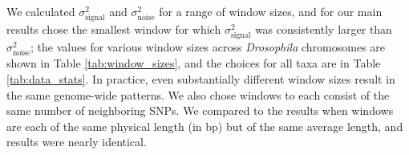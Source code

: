 \documentclass[11pt, oneside]{article}   	%
\begin{document}
We calculated $\sigma^2_\text{signal}$ and $\sigma^2_\text{noise}$
for a range of window sizes,
and for our main results
chose the smallest window for which $\sigma^2_\text{signal}$ was consistently larger than $\sigma^2_\text{noise}$;
the values for various window sizes across \textit{Drosophila} chromosomes are shown in Table \ref{tab:window_sizes},
and the choices for all taxa are in Table \ref{tab:data_stats}.
In practice, even substantially different window sizes result in the same genome-wide patterns.
We also chose windows to each consist of the same number of neighboring SNPs.
We compared to the results when windows are each of the same physical length (in bp) but of the same average length,
and results were nearly identical.

\end{document}
